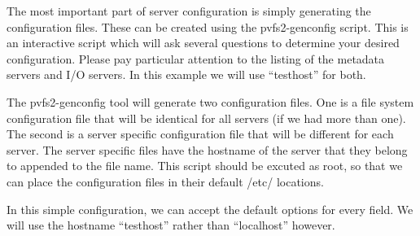 \documentclass[11pt, letterpaper]{article}
\begin{document}
The most important part of server configuration is simply generating the 
configuration files.  These can be created using the pvfs2-genconfig 
script.  This is an interactive script which will ask several questions
to determine your desired configuration.  Please pay particular attention
to the listing of the metadata servers and I/O servers.  
In this example we will use ``testhost'' for both.  

The pvfs2-genconfig tool will generate two configuration files.  One is
a file system configuration file that will be identical for all servers
(if we had more than one).  The second is a server specific configuration
file that will be different for each server.  The server specific files
have the hostname of the server that they belong to appended to the
file name.  This script should be excuted as root, so that we can place
the configuration files in their default /etc/ locations. 

In this simple configuration, we can accept the default options for every
field.  We will use the hostname ``testhost'' rather than ``localhost'' however.
\end{document}
